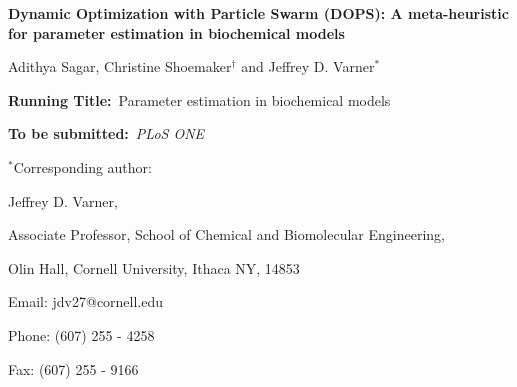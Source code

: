 \documentclass[12pt]{article}
\begin{document}
\begin{titlepage}
{\par\centering\textbf{\Large {Dynamic Optimization with Particle Swarm (DOPS): A meta-heuristic for parameter estimation in biochemical models}}}
\vspace{0.05in}
{\par \centering \large{Adithya Sagar, Christine Shoemaker$^{\dag}$ and Jeffrey D. Varner$^{*}$}}
\vspace{0.10in}
{\par {}}
{\par {}}
{\par {}}
\vspace{0.1in}
{\par \centering \textbf{Running Title:}~Parameter estimation in biochemical models}
\vspace{0.1in}
{\par \centering \textbf{To be submitted:}~\emph{PLoS ONE}}
\vspace{0.5in}
{\par \centering $^{*}$Corresponding author:}
{\par \centering Jeffrey D. Varner,}
{\par \centering Associate Professor, School of Chemical and Biomolecular Engineering,}
{\par {} Olin Hall, Cornell University, Ithaca NY, 14853}
{\par \centering Email: jdv27@cornell.edu}
{\par \centering Phone: (607) 255 - 4258}
{\par \centering Fax: (607) 255 - 9166}
\end{titlepage}
\date{}
\thispagestyle{empty}
\pagebreak
\end{document}
